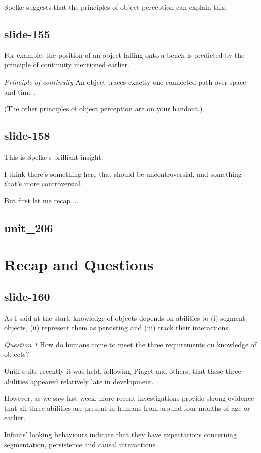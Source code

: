 \documentclass[12pt,\papersize]{extarticle}
\begin{document}
Spelke suggests that the principles of object perception can explain this.
 
\subsection{slide-155}
For example, the position of an object falling onto a bench is predicted by the principle of continuity mentioned earlier.
 
\emph{Principle of continuity} An object traces exactly one connected path over space and time \citep[p.\ 113]{spelke:1995_spatiotemporal}.
 
(The other principles of object perception are on your handout.)
 
\subsection{slide-158}
This is Spelke's brilliant insight.
 
I think there's something here that should be uncontroversial, and something that's more controversial.
 
But first let me recap ...
 
\subsection{unit\_206}
 
 
\section{Recap and Questions}
 
\subsection{slide-160}
As I said at the start, knowledge of objects depends on abilities to (i) segment objects, (ii) represent them as persisting and (iii) track their interactions.
 
\emph{Question 1}  How do humans come to meet the three requirements on knowledge of objects?
 
Until quite recently it was held, following Piaget and others, that these three abilities appeared relatively late in development.
 
However, as we saw last week, more recent investigations provide strong evidence that all three abilities are present in humans from around four months of age or earlier.
 
Infants' looking behaviours indicate that they have expectations concerning segmentation, persistence and causal interactions.
 
\end{document}
